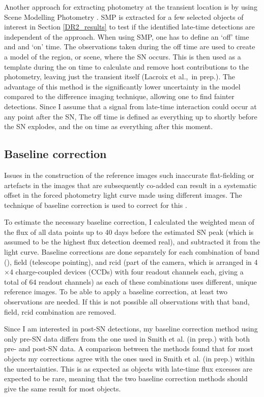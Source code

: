 \documentclass[a4paper,oneside,12pt, class=Latex/Classes/PhDthesisPSnPDF, crop=false]{standalone}
\begin{document}
Another approach for extracting photometry at the transient location is by using Scene Modelling Photometry \citep[SMP;][]{Holtzmann_SMP}. SMP is extracted for a few selected objects of interest in Section \ref{DR2_results} to test if the identified late-time detections are independent of the approach. When using SMP, one has to define an `off' time and and `on' time. The observations taken during the off time are used to create a model of the region, or scene, where the SN occurs. This is then used as a template during the on time to calculate and remove host contributions to the photometry, leaving just the transient itself (Lacroix et al.,~in prep.). The advantage of this method is the significantly lower uncertainty in the model compared to the difference imaging technique, allowing one to find fainter detections. Since I assume that a signal from late-time interaction could occur at any point after the SN, The off time is defined as everything up to shortly before the SN explodes, and the on time as everything after this moment.


\subsection{Baseline correction}
 Issues in the construction of the reference images such inaccurate flat-fielding or artefacts in the images that are subsequently co-added can result in a systematic offset in the forced photometry light curve made using different images. The technique of baseline correction is used to correct for this \citep{Yao_baseline_corr,Miller_baseline_corr}. 

To estimate the necessary baseline correction, I calculated the weighted mean of the flux of all data points up to 40 days before the estimated SN peak (which is assumed to be the highest flux detection deemed real), and subtracted it from the light curve. Baseline corrections are done separately for each combination of band (\ztfg\ztfr\ztfi), field (telescope pointing), and rcid (part of the camera, which is arranged in 4$\times$4 charge-coupled devices (CCDs) with four readout channels each, giving a total of 64 readout channels) as each of these combinations uses different, unique reference images. To be able to apply a baseline correction, at least two observations are needed. If this is not possible all observations with that band, field, rcid combination are removed.

Since I am interested in post-SN detections, my baseline correction method using only pre-SN data differs from the one used in Smith et al. (in prep.) with both pre- and post-SN data. A comparison between the methods found that for most objects my corrections agree with the ones used in Smith et al. (in prep.) within the uncertainties. This is as expected as objects with late-time flux excesses are expected to be rare, meaning that the two baseline correction methods should give the same result for most objects. 
\end{document}
